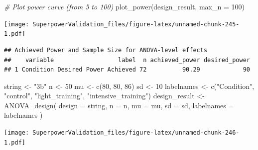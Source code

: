\documentclass[
]{book}
\newenvironment{Shaded}{\begin{snugshade}}{\end{snugshade}}
\newcommand{\AttributeTok}[1]{\textcolor[rgb]{0.77,0.63,0.00}{#1}}
\newcommand{\CommentTok}[1]{\textcolor[rgb]{0.56,0.35,0.01}{\textit{#1}}}
\newcommand{\DecValTok}[1]{\textcolor[rgb]{0.00,0.00,0.81}{#1}}
\newcommand{\FunctionTok}[1]{\textcolor[rgb]{0.00,0.00,0.00}{#1}}
\newcommand{\NormalTok}[1]{#1}
\newcommand{\OtherTok}[1]{\textcolor[rgb]{0.56,0.35,0.01}{#1}}
\newcommand{\SpecialCharTok}[1]{\textcolor[rgb]{0.00,0.00,0.00}{#1}}
\newcommand{\StringTok}[1]{\textcolor[rgb]{0.31,0.60,0.02}{#1}}
\begin{document}
\begin{Shaded}
\begin{Highlighting}[]
\CommentTok{\# Plot power curve (from 5 to 100)}
\FunctionTok{plot\_power}\NormalTok{(design\_result, }\AttributeTok{max\_n =} \DecValTok{100}\NormalTok{)}
\end{Highlighting}
\end{Shaded}

\texttt{[image: SuperpowerValidation\_files/figure-latex/unnamed-chunk-245-1.pdf]}

\begin{verbatim}
## Achieved Power and Sample Size for ANOVA-level effects
##    variable                  label  n achieved_power desired_power
## 1 Condition Desired Power Achieved 72          90.29            90
\end{verbatim}

\begin{Shaded}
\begin{Highlighting}[]
\NormalTok{string }\OtherTok{\textless{}{-}} \StringTok{"3b"}
\NormalTok{n }\OtherTok{\textless{}{-}} \DecValTok{50}
\NormalTok{mu }\OtherTok{\textless{}{-}} \FunctionTok{c}\NormalTok{(}\DecValTok{80}\NormalTok{, }\DecValTok{80}\NormalTok{, }\DecValTok{86}\NormalTok{)}
\NormalTok{sd }\OtherTok{\textless{}{-}} \DecValTok{10}
\NormalTok{labelnames }\OtherTok{\textless{}{-}} \FunctionTok{c}\NormalTok{(}\StringTok{"Condition"}\NormalTok{, }\StringTok{"control"}\NormalTok{, }\StringTok{"light\_training"}\NormalTok{, }\StringTok{"intensive\_training"}\NormalTok{)}
\NormalTok{design\_result }\OtherTok{\textless{}{-}} \FunctionTok{ANOVA\_design}\NormalTok{(}
  \AttributeTok{design =}\NormalTok{ string,}
  \AttributeTok{n =}\NormalTok{ n,}
  \AttributeTok{mu =}\NormalTok{ mu,}
  \AttributeTok{sd =}\NormalTok{ sd,}
  \AttributeTok{labelnames =}\NormalTok{ labelnames}
\NormalTok{)}
\end{Highlighting}
\end{Shaded}

\texttt{[image: SuperpowerValidation\_files/figure-latex/unnamed-chunk-246-1.pdf]}

\begin{Shaded}
\end{Shaded}
\end{document}
